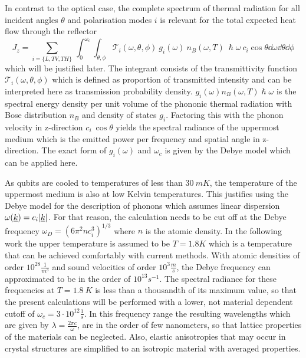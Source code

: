In contrast to the optical case, the complete spectrum of thermal
radiation for all incident angles $\theta$ and polarisation modes $i$ is
relevant for the total expected heat flow through the reflector
\begin{equation} \label{eq:totalheatflow}
    J_z = \sum\limits_{i=\{L,TV,TH\}}\ \int_0^{\omega_c}\int_{\theta, \phi}
    \mathcal{T}_i(\omega, \theta, \phi)\ g_i(\omega)\ n_B(\omega, T)\
    \hslash \omega\  c_i\cos \theta \dd{\omega} \dd{\theta}\dd{\phi}
\end{equation} \todo{normalisation factor for angle integrations?}
which will be justified later. The integrant
consists of the transmittivity function $\mathcal{T}_i(\omega, \theta, \phi)$
which is defined as proportion of transmitted intensity and can be interpreted
here as transmission probability density. $g_i(\omega)
    n_B(\omega,T)\hslash\omega$ is the spectral energy density per unit volume
of the phononic thermal radiation with Bose distribution $n_B$ and density of
states $g_i$. Factoring this with the phonon velocity in z-direction $c_i\
    \cos\theta$ yields the spectral radiance of the uppermost medium which is
the emitted power per frequency and spatial angle in z-direction. The exact
form of $g_i(\omega)$ and $\omega_c$ is given by the Debye model which can be
applied here.

As qubits are cooled to temperatures of less than $\SI{30}{mK}$, the
temperature of the uppermost medium is also at low Kelvin temperatures. This
justifies using the Debye model for the description of phonons which assumes
linear dispersion $\omega(\underline{k})=c_i |\underline{k}|$. For that reason,
the calculation needs to be cut off at the Debye frequency
$\omega_D = (6\pi^2 n c_i^3)^{1/3}$ where $n$ is the atomic density.
In the following work the upper temperature is assumed to be $T=1.8\si{K}$
which is a temperature that can be achieved comfortably with current methods.
With atomic densities of order $10^{28}\si{\frac{1}{m^3}}$ and sound velocities
of order $10^3\si{\frac{m}{s}}$, the Debye frequency can approximated to be in
the order of $10^{13}\si{s^{-1}}$. The spectral radiance for these frequencies
at $T=1.8\ \si{K}$ is less than a thousandth of its maximum value, so that the
present calculations will be performed with a lower, not material dependent
cutoff of $\omega_c=3\cdot 10^{12}\si{\frac{1}{s}}$.
In this frequency range the resulting wavelengths which are given by
$\lambda= \frac{2\pi c}{\omega}$, are in the order of few nanometers, so that
lattice properties of the materials can be neglected. Also, elastic
anisotropies that may occur in crystal structures are simplified to an
isotropic material with averaged properties.

